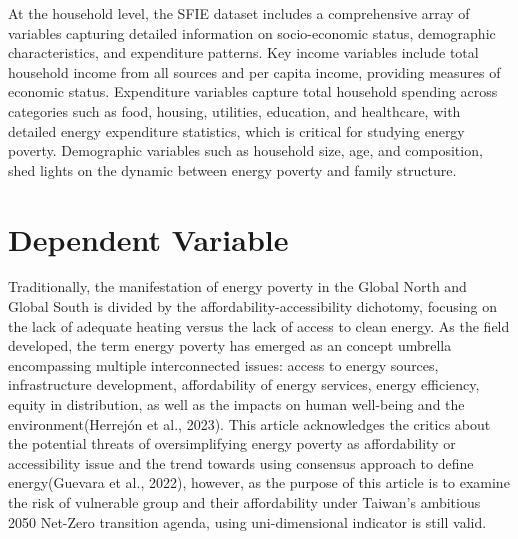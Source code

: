 \documentclass[
  twoside,
  openright,
  degree    = master,               %
  language  = english,              %
  fontset   = overleaf,             %
  watermark = true,                 %
  doi       = true,                 %
]{ntuthesis}
\begin{document}
At the household level, the SFIE dataset includes a comprehensive array
of variables capturing detailed information on socio-economic status,
demographic characteristics, and expenditure patterns. Key income
variables include total household income from all sources and per capita
income, providing measures of economic status. Expenditure variables
capture total household spending across categories such as food,
housing, utilities, education, and healthcare, with detailed energy
expenditure statistics, which is critical for studying energy poverty.
Demographic variables such as household size, age, and composition, shed
lights on the dynamic between energy poverty and family structure.

\hypertarget{dependent-variable}{%
\section{Dependent Variable}\label{dependent-variable}}

Traditionally, the manifestation of energy poverty in the Global North
and Global South is divided by the affordability-accessibility
dichotomy, focusing on the lack of adequate heating versus the lack of
access to clean energy. As the field developed, the term energy poverty
has emerged as an concept umbrella encompassing multiple interconnected
issues: access to energy sources, infrastructure development,
affordability of energy services, energy efficiency, equity in
distribution, as well as the impacts on human well-being and the
environment(Herrejón et al., 2023). This article acknowledges the
critics about the potential threats of oversimplifying energy poverty as
affordability or accessibility issue and the trend towards using
consensus approach to define energy(Guevara et al., 2022), however, as
the purpose of this article is to examine the risk of vulnerable group
and their affordability under Taiwan's ambitious 2050 Net-Zero
transition agenda, using uni-dimensional indicator is still valid.
\end{document}

